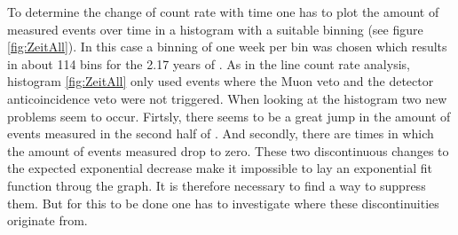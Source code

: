 \documentclass[encoding=utf8,british]{tumphthesis}
\begin{document}
To determine the change of count rate with time one has to plot the amount of measured events over time in a histogram with a suitable binning (see figure \ref{fig:ZeitAll}).
In this case a binning of one week per bin was chosen which results in about 114 bins for the 2.17 years of \PII.
As in the line count rate analysis, histogram \ref{fig:ZeitAll} only used events where the Muon veto and the detector anticoincidence veto were not triggered.
When looking at the histogram two new problems seem to occur.
Firtsly, there seems to be a great jump in the amount of events measured in the second half of \PII.
And secondly, there are times in which the amount of events measured drop to zero.
These two discontinuous changes to the expected exponential decrease make it impossible to lay an exponential fit function throug the graph.
It is therefore necessary to find a way to suppress them.
But for this to be done one has to investigate where these discontinuities originate from.
\\
\end{document}
